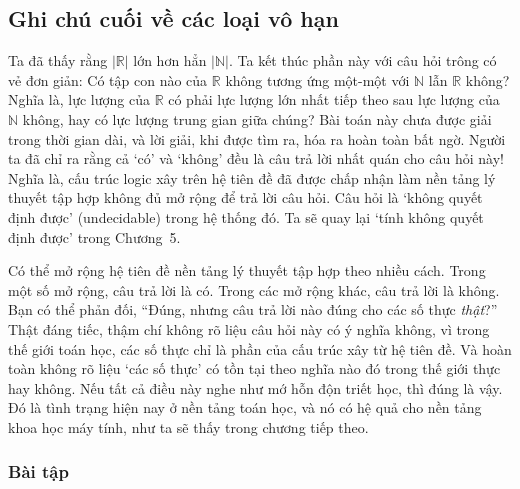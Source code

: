 \subsection{Ghi chú cuối về các loại vô hạn}

Ta đã thấy rằng $|\mathbb{R}|$ lớn hơn hẳn $|\mathbb{N}|$. Ta kết thúc phần này với câu hỏi trông có vẻ đơn giản: Có tập con nào của $\mathbb{R}$ không tương ứng một-một với $\mathbb{N}$ lẫn $\mathbb{R}$ không? Nghĩa là, lực lượng của $\mathbb{R}$ có phải lực lượng lớn nhất tiếp theo sau lực lượng của $\mathbb{N}$ không, hay có lực lượng trung gian giữa chúng? Bài toán này chưa được giải trong thời gian dài, và lời giải, khi được tìm ra, hóa ra hoàn toàn bất ngờ. Người ta đã chỉ ra rằng cả `có' và `không' đều là câu trả lời nhất quán cho câu hỏi này! Nghĩa là, cấu trúc logic xây trên hệ tiên đề đã được chấp nhận làm nền tảng lý thuyết tập hợp không đủ mở rộng để trả lời câu hỏi. Câu hỏi là `không quyết định được' (undecidable) trong hệ thống đó. Ta sẽ quay lại `tính không quyết định được' trong Chương~5.

Có thể mở rộng hệ tiên đề nền tảng lý thuyết tập hợp theo nhiều cách. Trong một số mở rộng, câu trả lời là có. Trong các mở rộng khác, câu trả lời là không. Bạn có thể phản đối, ``Đúng, nhưng câu trả lời nào đúng cho các số thực \emph{thật}?'' Thật đáng tiếc, thậm chí không rõ liệu câu hỏi này có ý nghĩa không, vì trong thế giới toán học, các số thực chỉ là phần của cấu trúc xây từ hệ tiên đề. Và hoàn toàn không rõ liệu `các số thực' có tồn tại theo nghĩa nào đó trong thế giới thực hay không. Nếu tất cả điều này nghe như mớ hỗn độn triết học, thì đúng là vậy. Đó là tình trạng hiện nay ở nền tảng toán học, và nó có hệ quả cho nền tảng khoa học máy tính, như ta sẽ thấy trong chương tiếp theo.

\subsubsection*{Bài tập}

